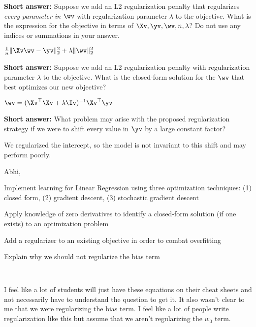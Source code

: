\begin{parts}
\begin{subparts}
    \subpart \textbf{Short answer:} Suppose we add an L2 regularization penalty that regularizes \textit{every parameter in $\wv$} with regularization parameter $\lambda$ to the objective. What is the expression for the objective in terms of $\Xv, \yv, \wv, n, \lambda$? Do not use any indices or summations in your answer.
    \begin{tcolorbox}[fit,height=1.5cm, width=6cm, blank, borderline={1pt}{-2pt}]
    \end{tcolorbox}
    \begin{soln}
    $\frac{1}{n} \|\Xv \wv - \yv \|_2^2 + \lambda \|\wv \|_2^2$
    \end{soln}   

    \subpart \textbf{Short answer:} Suppose we add an L2 regularization penalty with regularization parameter $\lambda$ to the objective. What is the closed-form solution for the $\wv$ that best optimizes our new objective?
    \begin{tcolorbox}[fit,height=1.5cm, width=6cm, blank, borderline={1pt}{-2pt}]
    \end{tcolorbox}
    \begin{soln}
    $\wv = (\Xv^\top \Xv + \lambda \Iv)^{-1} \Xv^\top \yv$
    \end{soln}

    \subpart \textbf{Short answer:} What problem may arise with the proposed regularization strategy if we were to shift every value in $\yv$ by a large constant factor?
    \fillwithlines{6em}
    \begin{soln}
        We regularized the intercept, so the model is not invariant to this shift and may perform poorly.
    \end{soln}
\end{subparts}
\begin{qauthor}
    Abhi,

    Implement learning for Linear Regression using three optimization techniques: (1)
closed form, (2) gradient descent, (3) stochastic gradient descent

Apply knowledge of zero derivatives to identify a closed-form solution (if one exists)
to an optimization problem


Add a regularizer to an existing objective in order to combat overfitting

Explain why we should not regularize the bias term
\end{qauthor}\\

\begin{qtester}
    I feel like a lot of students will just have these equations on their cheat sheets and not necessarily have to understand the question to get it. It also wasn't clear to me that we were regularizing the bias term. I feel like a lot of people write regularization like this but assume that we aren't regularizing the $w_0$ term.
\end{qtester}




\end{parts}
